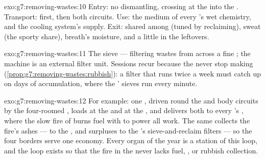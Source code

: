 \begin{solution}{exo:g7:removing-wastes:10}
Entry: no dismantling, crossing at the  into the
. Transport:  first, then both circuits.
Use: the medium of every 's wet chemistry, and the
cooling system's supply. Exit: shared among  (tuned
by reclaiming), sweat (the sporty share), breath's
moisture, and a little in the leftovers.
\end{solution}

\begin{solution}{exo:g7:removing-wastes:11}
The sieve --- filtering wastes from  across a fine
; the machine is an external filter unit. Sessions
recur because the  never stop making 
(\cref{prop:g7:removing-wastes:rubbish}): a filter that
runs twice a week must catch up on days of accumulation,
where the ' sieves run every minute.
\end{solution}

\begin{solution}{exo:g7:removing-wastes:12}
For example: one , driven round the  and body
circuits by the four-roomed , loads  at the
 and  at the , and delivers both to
every 's , where the slow fire of
 burns fuel with  to power all work. The
same  collects the fire's ashes --- 
to the ,  and surpluses to the 's
sieve-and-reclaim filters --- so the four borders serve
one economy. Every organ of the year is a station of
this loop, and the loop exists so that the fire in the
 never lacks fuel, , or rubbish collection.
\end{solution}

